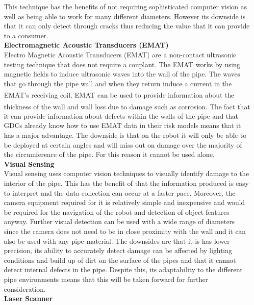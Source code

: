 \documentclass[11pt]{article}		%
\newcommand{\supercite}[1]{\textsuperscript{\cite{#1}}}		%
\begin{document}
	        This technique has the benefits of not requiring sophisticated computer vision as well as being able to work for many different diameters. 
	        However its downside is that it can only detect through cracks thus reducing the value that it can provide to a consumer. 
	        \\
	        \textbf{Electromagnetic Acoustic Transducers (EMAT)}
	        \\
	        Electro Magnetic Acoustic Transducers (EMAT) are a non-contact ultrasonic testing technique that does not require a couplant. 
	        The EMAT works by using magnetic fields to induce ultrasonic waves into the wall of the pipe.
	        The waves that go through the pipe wall and when they return induce a current in the EMAT’s receiving coil.\supercite{EMAT}
	        EMAT can be used to provide information about the thickness of the wall and wall loss due to damage such as corrosion. \supercite{EMAT}
	        The fact that it can provide information about defects within the walls of the pipe and that GDCs already know how to use EMAT data in their risk models means that it has a major advantage. 
	        The downside is that on the robot it will only be able to be deployed at certain angles and will miss out on damage over the majority of the circumference of the pipe. 
	        For this reason it  cannot be used alone.
			\\
			\textbf{Visual Sensing}
			\\
	        Visual sensing uses computer vision techniques to visually identify damage to the interior of the pipe. 
	        This has the benefit of that the information produced is easy to interpret and the data collection can occur at a faster pace. %
	        Moreover, the camera equipment required for it is relatively simple and inexpensive and would be required for the navigation of the robot and detection of object features anyway. 
	        Further visual detection can be used with a wide range of diameters since the camera does not need to be in close proximity with the wall and it can also be used with any pipe material. 
	        The downsides are that it is has lower precision, its ability to accurately detect damage can be affected by lighting conditions and build up of dirt on the surface of the pipes and  that it cannot detect internal defects in the pipe.
	        Despite this, its adaptability to the different pipe environments means that this will be taken forward for further consideration.
	        \\
	        \textbf{Laser Scanner}
\end{document}
